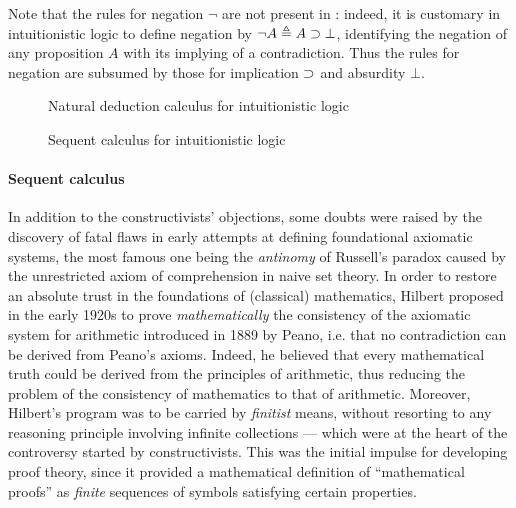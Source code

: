 \begin{remark}
  Note that the rules for negation $\neg$ are not present in
  : indeed, it is customary in intuitionistic logic to define
  negation by $\neg A \triangleq A \supset \bot$, identifying the negation of any
  proposition $A$ with its implying of a contradiction. Thus the rules for
  negation are subsumed by those for implication $\supset$ and absurdity $\bot$.
\end{remark}

\begin{figure*}
  
  \caption{Natural deduction calculus  for intuitionistic logic}
\end{figure*}

\begin{figure*}
  
  \caption{Sequent calculus  for intuitionistic logic}
\end{figure*}

\paragraph{Sequent calculus}

In addition to the constructivists' objections, some doubts were raised by the
discovery of fatal flaws in early attempts at defining foundational axiomatic
systems, the most famous one being the \emph{antinomy} of Russell's paradox
caused by the unrestricted axiom of comprehension in naive set theory. In order
to restore an absolute trust in the foundations of (classical) mathematics,
Hilbert proposed in the early 1920s to prove \emph{mathematically} the
consistency of the axiomatic system for arithmetic introduced in 1889 by
Peano,
i.e. that no contradiction can be derived from Peano's axioms. Indeed, he
believed that every mathematical truth could be derived from the principles of
arithmetic, thus reducing the problem of the consistency of mathematics to that
of arithmetic. Moreover, Hilbert's program was to be carried by \emph{finitist}
means, without resorting to any reasoning principle involving infinite
collections --- which were at the heart of the controversy started by
constructivists. This was the initial impulse for developing proof theory, since
it provided a mathematical definition of ``mathematical proofs'' as
\emph{finite} sequences of symbols satisfying certain properties.

